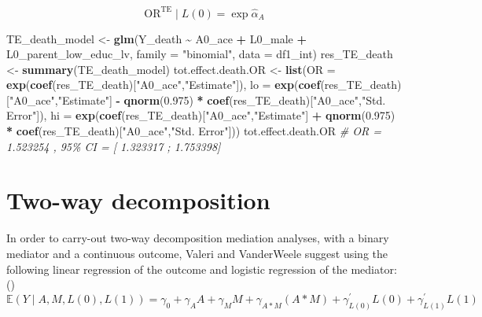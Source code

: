 \documentclass[
]{book}
\newenvironment{Shaded}{\begin{snugshade}}{\end{snugshade}}
\newcommand{\AttributeTok}[1]{\textcolor[rgb]{0.13,0.29,0.53}{#1}}
\newcommand{\CommentTok}[1]{\textcolor[rgb]{0.56,0.35,0.01}{\textit{#1}}}
\newcommand{\FloatTok}[1]{\textcolor[rgb]{0.00,0.00,0.81}{#1}}
\newcommand{\FunctionTok}[1]{\textcolor[rgb]{0.13,0.29,0.53}{\textbf{#1}}}
\newcommand{\NormalTok}[1]{#1}
\newcommand{\OtherTok}[1]{\textcolor[rgb]{0.56,0.35,0.01}{#1}}
\newcommand{\SpecialCharTok}[1]{\textcolor[rgb]{0.81,0.36,0.00}{\textbf{#1}}}
\newcommand{\StringTok}[1]{\textcolor[rgb]{0.31,0.60,0.02}{#1}}
\begin{document}
\[ \text{OR}^{\text{TE}} \mid L(0) = \exp \hat{\alpha}_A \]

\begin{Shaded}
\begin{Highlighting}[]
\NormalTok{TE\_death\_model }\OtherTok{\textless{}{-}} \FunctionTok{glm}\NormalTok{(Y\_death }\SpecialCharTok{\textasciitilde{}}\NormalTok{ A0\_ace }\SpecialCharTok{+}\NormalTok{ L0\_male }\SpecialCharTok{+}\NormalTok{ L0\_parent\_low\_educ\_lv,}
                      \AttributeTok{family =} \StringTok{"binomial"}\NormalTok{,}
                      \AttributeTok{data =}\NormalTok{ df1\_int)}
\NormalTok{res\_TE\_death }\OtherTok{\textless{}{-}} \FunctionTok{summary}\NormalTok{(TE\_death\_model)}
\NormalTok{tot.effect.death.OR }\OtherTok{\textless{}{-}} \FunctionTok{list}\NormalTok{(}\AttributeTok{OR =} \FunctionTok{exp}\NormalTok{(}\FunctionTok{coef}\NormalTok{(res\_TE\_death)[}\StringTok{"A0\_ace"}\NormalTok{,}\StringTok{"Estimate"}\NormalTok{]),}
                            \AttributeTok{lo =} \FunctionTok{exp}\NormalTok{(}\FunctionTok{coef}\NormalTok{(res\_TE\_death)[}\StringTok{"A0\_ace"}\NormalTok{,}\StringTok{"Estimate"}\NormalTok{] }\SpecialCharTok{{-}}
                                       \FunctionTok{qnorm}\NormalTok{(}\FloatTok{0.975}\NormalTok{) }\SpecialCharTok{*}
                                       \FunctionTok{coef}\NormalTok{(res\_TE\_death)[}\StringTok{"A0\_ace"}\NormalTok{,}\StringTok{"Std. Error"}\NormalTok{]),}
                            \AttributeTok{hi =} \FunctionTok{exp}\NormalTok{(}\FunctionTok{coef}\NormalTok{(res\_TE\_death)[}\StringTok{"A0\_ace"}\NormalTok{,}\StringTok{"Estimate"}\NormalTok{] }\SpecialCharTok{+}
                                       \FunctionTok{qnorm}\NormalTok{(}\FloatTok{0.975}\NormalTok{) }\SpecialCharTok{*}
                                       \FunctionTok{coef}\NormalTok{(res\_TE\_death)[}\StringTok{"A0\_ace"}\NormalTok{,}\StringTok{"Std. Error"}\NormalTok{]))}
\NormalTok{tot.effect.death.OR}
\CommentTok{\# OR = 1.523254 , 95\% CI = [ 1.323317 ; 1.753398]}
\end{Highlighting}
\end{Shaded}

\section{Two-way decomposition}\label{trad2way}

In order to carry-out two-way decomposition mediation analyses, with a binary mediator and a continuous outcome, Valeri and VanderWeele suggest using the following linear regression of the outcome and logistic regression of the mediator:()
\begin{equation}
\mathbb{E}(Y \mid A, M,L(0),L(1)) = \gamma_0 + \gamma_A A + \gamma_M M + \gamma_{A \ast M} (A \ast M) + \gamma_{L(0)}^\prime L(0) + \gamma_{L(1)}^\prime L(1) 
\label{eq:contoutcomereg}
\end{equation}
\end{document}
